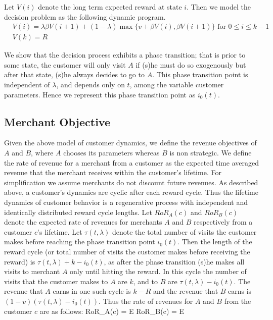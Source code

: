 Let $V(i)$ denote the long term expected reward at state $i$. Then we model the decision problem as the following dynamic program.
\begin{align*}
& V(i) = \lambda \beta V(i+1) + (1-\lambda)\max\{v+\beta V(i),\beta V(i+1) \} \mbox{ for } 0\leq i \leq k-1 \\
& V(k) = R
\end{align*}

We show that the decision process exhibits a phase transition; that is prior to some state, the customer will only visit $A$ if (s)he must do so exogenously but after that state, (s)he always decides to go to $A$. 
This phase transition point is independent of $\lambda$, and depends only on $t$, among the variable customer parameters.
Hence we represent this phase transition point as $i_0(t)$.

\subsection{Merchant Objective}
Given the above model of customer dynamics, we define the revenue objectives of $A$ and $B$, where $A$ chooses its parameters whereas $B$ is non strategic. 
We define the rate of revenue for a merchant from a customer as the expected time averaged revenue that the merchant receives within the customer's lifetime.
For simplification we assume merchants do not discount future revenues.
As described above, a customer's dynamics are cyclic after each reward cycle.
Thus the lifetime dynamics of customer behavior is a regenerative process with independent and identically distributed reward cycle lengths.
Let $RoR_A(c)$ and $RoR_B(c)$ denote the expected rate of revenues for merchants $A$ and $B$ respectively from a customer $c$'s lifetime.
Let $\tau(t, \lambda)$ denote the total number of visits the customer makes before reaching the phase transition point $i_0(t)$.
Then the length of the reward cycle (or total number of visits the customer makes before receiving the reward) is $\tau(t, \lambda) + k - i_0(t)$, as after the phase transition (s)he makes all visits to merchant $A$ only until hitting the reward.
In this cycle the number of visits that the customer makes to $A$ are $k$, and to $B$ are $\tau(t,\lambda) - i_0(t)$.
The revenue that $A$ earns in one such cycle is $k-R$ and the revenue that $B$ earns is $(1-v)(\tau(t,\lambda) - i_0(t))$.
Thus the rate of revenues for $A$ and $B$ from the customer $c$ are as follows:
\beq
RoR_A(c) = \underset{\tau}E\notag
\eeq
\beq
RoR_B(c) = \underset{\tau}E\notag
\eeq

